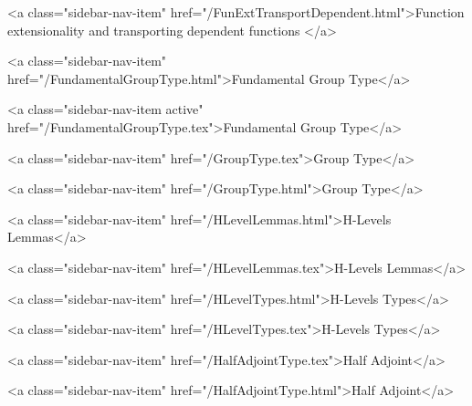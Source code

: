       
        
          <a class="sidebar-nav-item" href="/FunExtTransportDependent.html">Function extensionality and transporting dependent functions </a>
        
      
    
      
        
          <a class="sidebar-nav-item" href="/FundamentalGroupType.html">Fundamental Group Type</a>
        
      
    
      
        
          <a class="sidebar-nav-item active" href="/FundamentalGroupType.tex">Fundamental Group Type</a>
        
      
    
      
        
          <a class="sidebar-nav-item" href="/GroupType.tex">Group Type</a>
        
      
    
      
        
          <a class="sidebar-nav-item" href="/GroupType.html">Group Type</a>
        
      
    
      
        
          <a class="sidebar-nav-item" href="/HLevelLemmas.html">H-Levels Lemmas</a>
        
      
    
      
        
          <a class="sidebar-nav-item" href="/HLevelLemmas.tex">H-Levels Lemmas</a>
        
      
    
      
        
          <a class="sidebar-nav-item" href="/HLevelTypes.html">H-Levels Types</a>
        
      
    
      
        
          <a class="sidebar-nav-item" href="/HLevelTypes.tex">H-Levels Types</a>
        
      
    
      
        
          <a class="sidebar-nav-item" href="/HalfAdjointType.tex">Half Adjoint</a>
        
      
    
      
        
          <a class="sidebar-nav-item" href="/HalfAdjointType.html">Half Adjoint</a>
        
